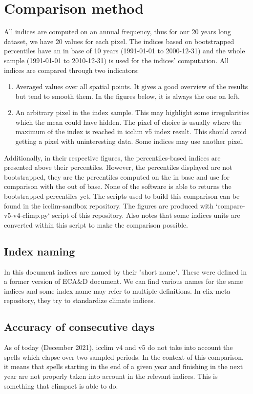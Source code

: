 \documentclass[a4paper,11pt]{article}
\begin{document}
\section{Comparison method}
    All indices are computed on an annual frequency, thus for our 20 years long dataset, we have 20 values for each pixel.
    The indices based on bootstrapped percentiles have an in base of 10 years (1991-01-01 to 2000-12-31) and the whole sample (1991-01-01 to 2010-12-31) is used for the indices' computation.
    All indices are compared through two indicators: 
    \begin{enumerate}
        \item Averaged values over all spatial points. 
        It gives a good overview of the results but tend to smooth them. In the figures below, it is always the one on left.
        \item An arbitrary pixel in the index sample. This may highlight some irregularities which the mean could have hidden. The pixel of choice is usually where the maximum of the index is reached in icclim v5 index result. This should avoid getting a pixel with uninteresting data. Some indices may use another pixel.
    \end{enumerate}
    Additionally, in their respective figures, the percentiles-based indices are presented above their percentiles. However, the percentiles displayed are not bootstrapped, they are the percentiles computed on the in base and use for comparison with the out of base. None of the software is able to returns the bootstrapped percentiles yet.
    The scripts used to build this comparison can be found in the icclim-sandbox repository\cite{gh/icclim_sandbox}.
    The figures are produced with `compare-v5-v4-climp.py` script of this repository.
    Also notes that some indices units are converted within this script to make the comparison possible.

\subsection{Index naming}
    In this document indices are named by their "short name". These were defined in a former version of ECA\&D document\cite{doc/ecad_old}.
    We can find various names for the same indices and some index name may refer to multiple definitions. In clix-meta\cite{gh/clixmeta} repository, they try to standardize climate indices.

\subsection{Accuracy of consecutive days}
    As of today (December 2021), icclim v4 and v5 do not take into account the spells which elapse over two sampled periods. In the context of this comparison, it means that spells starting in the end of a given year and finishing in the next year are not properly taken into account in the relevant indices.
    This is something that climpact is able to do.
\end{document}
